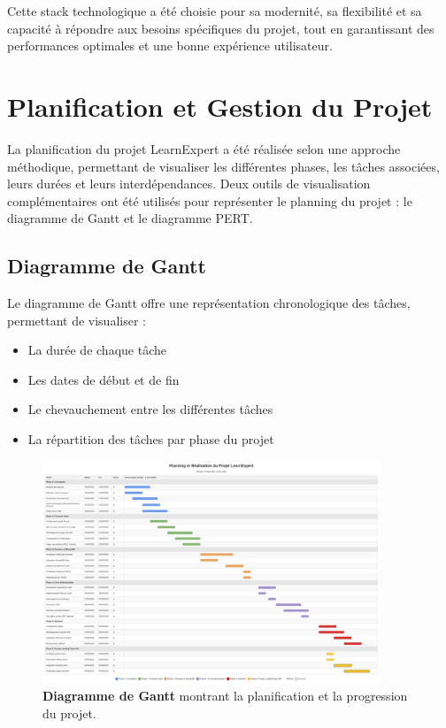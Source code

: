 Cette stack technologique a été choisie pour sa modernité, sa flexibilité et sa capacité à répondre aux besoins spécifiques du projet, tout en garantissant des performances optimales et une bonne expérience utilisateur. 

\section{Planification et Gestion du Projet}

La planification du projet LearnExpert a été réalisée selon une approche méthodique, permettant de visualiser les différentes phases, les tâches associées, leurs durées et leurs interdépendances. Deux outils de visualisation complémentaires ont été utilisés pour représenter le planning du projet : le diagramme de Gantt et le diagramme PERT.

\subsection{Diagramme de Gantt}

Le diagramme de Gantt offre une représentation chronologique des tâches, permettant de visualiser :
\begin{itemize}[leftmargin=*,noitemsep,topsep=0pt]
  \item La durée de chaque tâche
  \item Les dates de début et de fin
  \item Le chevauchement entre les différentes tâches
  \item La répartition des tâches par phase du projet
\end{itemize}

\begin{figure}[htb]
  \centering
  \includegraphics[width=0.9\textwidth,keepaspectratio]{images/gestion_projet/gantt_diagram.png}
  \caption{\textbf{Diagramme de Gantt} montrant la planification et la progression du projet.}
  \label{fig:gantt_diagram}
\end{figure}

